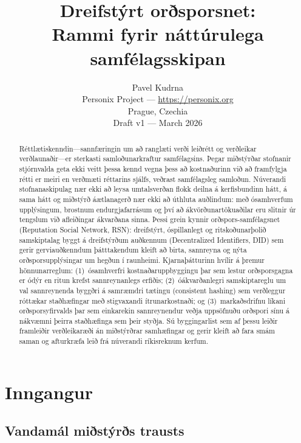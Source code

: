 \documentclass[11pt,a4paper,twocolumn]{article}
\title{\textbf{Dreifstýrt orðsporsnet:\\Rammi fyrir náttúrulega samfélagsskipan}}
\author{Pavel Kudrna\\Personix Project --- \url{https://personix.org}\\Prague, Czechia\\Draft v1 --- March 2026}
\date{}
\begin{document}
\maketitle

\begin{abstract}
Réttlætiskenndin---sannfæringin um að ranglæti verði leiðrétt og verðleikar verðlaunaðir---er sterkasti samloðunarkraftur samfélagsins. Þegar miðstýrðar stofnanir stjórnvalda geta ekki veitt þessa kennd vegna þess að kostnaðurinn við að framfylgja rétti er meiri en verðmæti réttarins sjálfs, veðrast samfélagsleg samloðun. Núverandi stofnanaskipulag nær ekki að leysa umtalsverðan flokk deilna á kerfisbundinn hátt, á sama hátt og miðstýrð áætlanagerð nær ekki að úthluta auðlindum: með ósamhverfum upplýsingum, brostnum endurgjafarrásum og því að ákvörðunartökuaðilar eru slitnir úr tengslum við afleiðingar ákvarðana sinna. Þessi grein kynnir orðspors-samfélagsnet (Reputation Social Network, RSN): dreifstýrt, óspillanlegt og ritskoðunarþolið samskiptalag byggt á dreifstýrðum auðkennum (Decentralized Identifiers, DID) sem gerir gerviauðkenndum þátttakendum kleift að birta, sannreyna og nýta orðsporsupplýsingar um hegðun í raunheimi. Kjarnaþátturinn hvílir á þremur hönnunarreglum: (1)~ósamhverfri kostnaðaruppbyggingu þar sem lestur orðsporsgagna er ódýr en ritun krefst sannreynanlegs erfiðis; (2)~óákvarðanlegri samskiptareglu um val sannreynenda byggðri á samræmdri tætingu (consistent hashing) sem verðleggur róttækar staðhæfingar með stigvaxandi ítrunarkostnaði; og (3)~markaðsdrifnu líkani orðsporsyfirvalds þar sem einkarekin sannreynendur veðja uppsöfnuðu orðspori sínu á nákvæmni þeirra staðhæfinga sem þeir styðja. Sú byggingarlist sem af þessu leiðir framleiðir verðleikaræði án miðstýrðrar samhæfingar og gerir kleift að fara smám saman og afturkræfa leið frá núverandi ríkisreknum kerfum.
\end{abstract}

\section{Inngangur}

\subsection{Vandamál miðstýrðs trausts}
\end{document}
